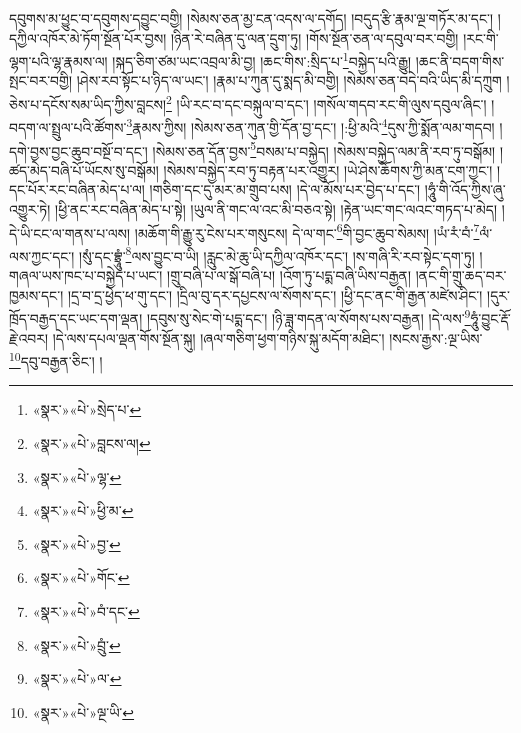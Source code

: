 དབུགས་མ་ཕྱུང་བ་དབུགས་དབྱུང་བགྱི། །སེམས་ཅན་མྱ་ངན་འདས་ལ་དགོད། །བདུད་རྩི་རྣམ་ལྔ་གཏོར་མ་དང་། །དཀྱིལ་འཁོར་མེ་ཏོག་སྔོན་པོར་བྱས། །ཉིན་རེ་བཞིན་དུ་ལན་དྲུག་ཏུ། །གོས་སྔོན་ཅན་ལ་དབུལ་བར་བགྱི། །རང་གི་ལྷག་པའི་ལྷ་རྣམས་ལ། །སྐད་ཅིག་ཙམ་ཡང་འབྲལ་མི་བྱ། །ཆང་གིས་:སྲིད་པ་\footnote{«སྣར་»«པེ་»སྲེད་པ་}བསྐྱེད་པའི་རྒྱུ། །ཆང་ནི་བདག་གིས་སྤང་བར་བགྱི། །ཤེས་རབ་སྟོང་པ་ཉིད་ལ་ཡང་། །རྣམ་པ་ཀུན་དུ་སྨད་མི་བགྱི། །སེམས་ཅན་བདེ་བའི་ཡིད་མི་དཀྲུག །ཅེས་པ་དངོས་སམ་ཡིད་ཀྱིས་བླངས།\footnote{«སྣར་»«པེ་»བླངས་ལ།} །ཡི་རང་བ་དང་བསྐུལ་བ་དང་། །གསོལ་གདབ་རང་གི་ལུས་དབུལ་ཞིང་། །བདག་ལ་སྤྲུལ་པའི་ཚོགས་\footnote{«སྣར་»«པེ་»ལྷ་}རྣམས་ཀྱིས། །སེམས་ཅན་ཀུན་གྱི་དོན་བྱ་དང་། །:ཕྱི་མའི་\footnote{«སྣར་»«པེ་»ཕྱི་མ་}དུས་ཀྱི་སྨོན་ལམ་གདབ། །དགེ་བྱས་བྱང་ཆུབ་བསྔོ་བ་དང་། །སེམས་ཅན་དོན་བྱས་\footnote{«སྣར་»«པེ་»བྱ་}བསམ་པ་བསྐྱེད། །སེམས་བསྐྱེད་ལམ་ནི་རབ་ཏུ་བསྒོམ། །ཚད་མེད་བཞི་པོ་ཡོངས་སུ་བསྒོམ། །སེམས་བསྐྱེད་རབ་ཏུ་བརྟན་པར་འགྱུར། །ཡེ་ཤེས་ཆོགས་ཀྱི་མན་ངག་ཀྱང་། །དང་པོར་རང་བཞིན་མེད་པ་ལ། །གཅིག་དང་དུ་མར་མ་གྲུབ་པས། །དེ་ལ་མོས་པར་བྱེད་པ་དང་། །ཧཱུཾ་གི་འོད་ཀྱིས་ཞུ་འགྱུར་ཏེ། །ཕྱི་ནང་རང་བཞིན་མེད་པ་སྟེ། །ཡུལ་ནི་གང་ལ་འང་མི་བཅའ་སྟེ། །རྟེན་ཡང་གང་ལའང་གཏད་པ་མེད། །དེ་ཡི་ངང་ལ་གནས་པ་ལས། །མཆོག་གི་རྒྱུ་རུ་ངེས་པར་གསུངས། དེ་ལ་གང་\footnote{«སྣར་»«པེ་»གོང་}གི་བྱང་ཆུབ་སེམས། །ཡཾ་རཾ་བཾ་\footnote{«སྣར་»«པེ་»བཾ་དང་}ལཾ་ལས་ཀྱང་དང་། །སུཾ་དང་བྷྲཱུཾ་\footnote{«སྣར་»«པེ་»བྲུཾ་}ལས་བྱུང་བ་ཡི། །རླུང་མེ་ཆུ་ཡི་དཀྱིལ་འཁོར་དང་། །ས་གཞི་རི་རབ་སྟེང་དག་ཏུ། །གཞལ་ཡས་ཁང་པ་བསྐྱེད་པ་ཡང་། །གྲུ་བཞི་པ་ལ་སྒོ་བཞི་པ། །འོག་ཏུ་པདྨ་བཞི་ཡིས་བརྒྱན། །ནང་གི་གྲུ་ཆད་བར་ཁྱམས་དང་། །དྲ་བ་དྲ་ཕྱེད་ཕ་གུ་དང་། །དྲིལ་བུ་དར་དཔྱངས་ལ་སོགས་དང་། །ཕྱི་དང་ནང་གི་རྒྱན་མཛེས་ཤིང་། །དུར་ཁྲོད་བརྒྱད་དང་ཡང་དག་ལྡན། །དབུས་སུ་སེང་གེ་པདྨ་དང་། །ཉི་ཟླ་གདན་ལ་སོགས་པས་བརྒྱན། །དེ་ལས་\footnote{«སྣར་»«པེ་»ལ་}ཧཱུཾ་བྱུང་རྡོ་རྗེ་འབར། །དེ་ལས་དཔལ་ལྡན་གོས་སྔོན་སྐུ། །ཞལ་གཅིག་ཕྱག་གཉིས་སྐུ་མདོག་མཐིང་། །སངས་རྒྱས་:ལྔ་ཡིས་\footnote{«སྣར་»«པེ་»ལྔ་ཡི་}དབུ་བརྒྱན་ཅིང་། །
